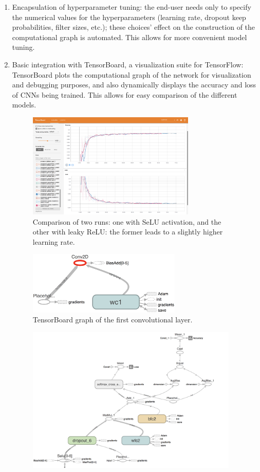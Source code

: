 \documentclass[a4paper, 11pt]{article} %
\begin{document}
		\begin{enumerate}
			\item Encapsulation of hyperparameter tuning: the end-user needs 
			only to specify the numerical values for the hyperparameters 
			(learning rate, dropout keep probabilities, filter sizes, etc.); 
			these choices' effect on the construction of the computational 
			graph is automated. This allows for more convenient model tuning.
			\item Basic integration with TensorBoard, a visualization suite for 
			TensorFlow: TensorBoard plots the computational graph of the 
			network for visualization and debugging purposes, and also 
			dynamically displays the accuracy and loss of CNNs being trained. 
			This allows for easy comparison of the different models.
			\begin{figure}[H]
				\centering
				\includegraphics[height=5cm]{figures/tb_acc_loss}
				\caption{Comparison of two runs: one with SeLU activation, and 
				the other with leaky ReLU: the former leads to a slightly 
				higher learning rate.}
			\end{figure}
			\begin{figure}[H]
				\centering
				\includegraphics[height=3cm]{figures/tb_graph_1}
				\caption{TensorBoard graph of the first convolutional layer.}
			\end{figure}
			\begin{figure}[H]
				\centering
				\includegraphics[height=7cm]{figures/tb_graph_2}

\end{figure}
\end{enumerate}
\end{document}
